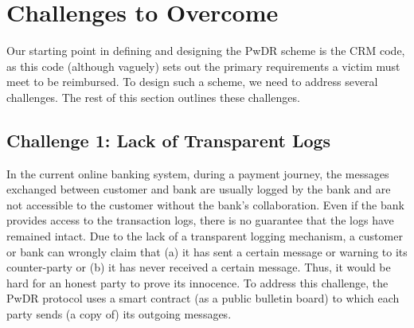 
\vspace{-3mm}
\section{Challenges to Overcome}\label{sec:: challenges}


Our starting point in defining and  designing the PwDR scheme is the CRM code, as this code (although vaguely) sets out the primary requirements a victim must meet to be reimbursed.  To design such a scheme, we need to address  several challenges. The rest of this section  outlines these challenges. 




\vspace{-3mm}
\subsection{Challenge 1: Lack of Transparent Logs} 
In the current online  banking system, during a payment journey, the messages exchanged between customer and bank are usually logged by the bank and are not accessible to the customer without the bank's collaboration. Even if the bank provides access to the transaction logs, there is no guarantee that the logs have remained intact. Due to the lack of a transparent logging mechanism, a customer or bank can wrongly claim that (a) it has sent a certain message or warning to its counter-party or (b) it has never  received a certain message.  Thus, it would be hard for an honest party  to prove its innocence. To address this challenge, the PwDR protocol uses a  smart contract (as a public bulletin board) to which  each party sends (a copy of) its outgoing messages. %



